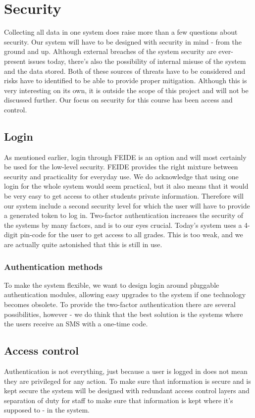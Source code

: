 \section{Security}

Collecting all data in one system does raise more than a few questions about security. Our system will have to be designed with security in mind - from the ground and up. 
Although external breaches of the system security are ever-present issues today, there's also the possibility of internal misuse of the system and the data stored. Both of these 
sources of threats have to be considered and risks have to identified to be able to provide proper mitigation. Although this is very interesting on its own, it is outside the scope 
of this project and will not be discussed further. Our focus on security for this course has been access and control.

\subsection{Login}
As mentioned earlier, login through FEIDE is an option and will most certainly be used for the low-level security. FEIDE provides the right mixture between security and practicality for everyday use. We do acknowledge that using one login for the whole system would seem practical, but it also means that it would be very easy to get access to other students private information. Therefore will our system include a second security level for which the user will have to provide a generated token to log in. Two-factor authentication increases the security of the systems by many factors, and is to our eyes crucial. Today's system uses a 4-digit pin-code for the user to get access to all grades. This is too weak, and we are actually quite astonished that this is still in use. 

\subsubsection{Authentication methods}
To make the system flexible, we want to design login around pluggable authentication modules, allowing easy upgrades to the system if one technology becomes obsolete. To provide the 
two-factor authentication there are several possibilities, however - we do think that the best solution is the systems where the users receive an SMS with a one-time code. 

\subsection{Access control}
Authentication is not everything, just because a user is logged in does not mean they are privileged for any action. To make sure that information is secure and is kept secure the system will be designed with redundant access control layers and separation of duty for staff to make sure that information is kept where it's supposed to - in the system. 